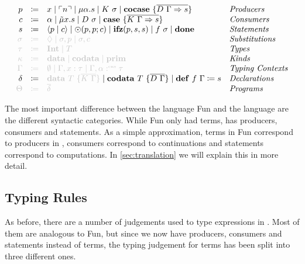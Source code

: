 \begin{definition}
  \[
    \begin{array}{rcll}
      p & \coloneqq & x \mid \lit{n} \mid \mu\alpha.s \mid K\ \sigma \mid \cocase{\overline{D\ \Gamma \Rightarrow s}} & \emph{Producers}\\
      c & \coloneqq & \alpha \mid \tilde{\mu}x.s \mid D\ \sigma \mid \case{\overline{K\ \Gamma \Rightarrow s}}& \emph{Consumers}\\
      s & \coloneqq & \cut{p}{c} \mid \odot(p, p; c) \mid \ifz{p}{s}{s} \mid f\ \sigma\mid \done & \emph{Statements}\\
      \grey{\sigma} & \grey{\coloneqq} & \grey{\nil \mid \sigma, p \mid \sigma, c} & \emph{Substitutions}\\
      \grey{\tau} & \grey{\coloneqq} & \grey{\tyint \mid T} & \emph{Types}\\
      \grey{\kappa} & \grey{\coloneqq} & \grey{\mathbf{data}\mid\mathbf{codata}\mid\mathbf{prim}} & \emph{Kinds}\\
      \grey{\Gamma} & \grey{\coloneqq} & \grey{\emptyset \mid \Gamma, x : \tau \mid \Gamma, \alpha \cnt \tau} & \emph{Typing Contexts} \\
      \delta & \coloneqq & \grey{\mathbf{data}\ T\ \{ \overline{K\ \Gamma} \}} \mid \mathbf{codata}\ T\ \{ \overline{D\ \Gamma }\} \mid \defi{f\ \Gamma}{s} & \emph{Declarations}\\
      \grey{\Theta} & \grey{\coloneqq} & \grey{\overline{\delta}} & \emph{Programs}\\
    \end{array}
  \]
\end{definition}
The most important difference between the language Fun and the language \targetlang{} are the different syntactic categories.
While Fun only had terms, \targetlang{} has producers, consumers and statements. 
As a simple approximation, terms in Fun correspond to producers in \targetlang{}, consumers correspond to continuations and statements correspond to computations. 
In \cref{sec:translation} we will explain this in more detail.

\subsection{Typing Rules}
\label{subsec:core:typing-rules}

As before, there are a number of judgements used to type expressions in \targetlang{}. 
Most of them are analogous to Fun, but since we now have producers, consumers and statements instead of terms, the typing judgement for terms has been split into three different ones. 

